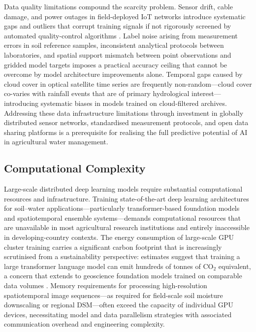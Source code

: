 \documentclass[land,article,submit,pdftex,moreauthors]{Definitions/mdpi}
\numberwithin{equation}{section}
\begin{document}
Data quality limitations compound the scarcity problem. Sensor drift, cable damage, and power outages in field-deployed IoT networks introduce systematic gaps and outliers that corrupt training signals if not rigorously screened by automated quality-control algorithms \citep{gruber2020}. Label noise arising from measurement errors in soil reference samples, inconsistent analytical protocols between laboratories, and spatial support mismatch between point observations and gridded model targets imposes a practical accuracy ceiling that cannot be overcome by model architecture improvements alone. Temporal gaps caused by cloud cover in optical satellite time series are frequently non-random---cloud cover co-varies with rainfall events that are of primary hydrological interest---introducing systematic biases in models trained on cloud-filtered archives. Addressing these data infrastructure limitations through investment in globally distributed sensor networks, standardised measurement protocols, and open data sharing platforms is a prerequisite for realising the full predictive potential of AI in agricultural water management.

\subsection{Computational Complexity}

Large-scale distributed deep learning models require substantial computational resources and infrastructure. Training state-of-the-art deep learning architectures for soil--water applications---particularly transformer-based foundation models and spatiotemporal ensemble systems---demands computational resources that are unavailable in most agricultural research institutions and entirely inaccessible in developing-country contexts. The energy consumption of large-scale GPU cluster training carries a significant carbon footprint that is increasingly scrutinised from a sustainability perspective: estimates suggest that training a large transformer language model can emit hundreds of tonnes of CO$_2$ equivalent, a concern that extends to geoscience foundation models trained on comparable data volumes \citep{schwartz2020green}. Memory requirements for processing high-resolution spatiotemporal image sequences---as required for field-scale soil moisture downscaling or regional DSM---often exceed the capacity of individual GPU devices, necessitating model and data parallelism strategies with associated communication overhead and engineering complexity.
\end{document}
